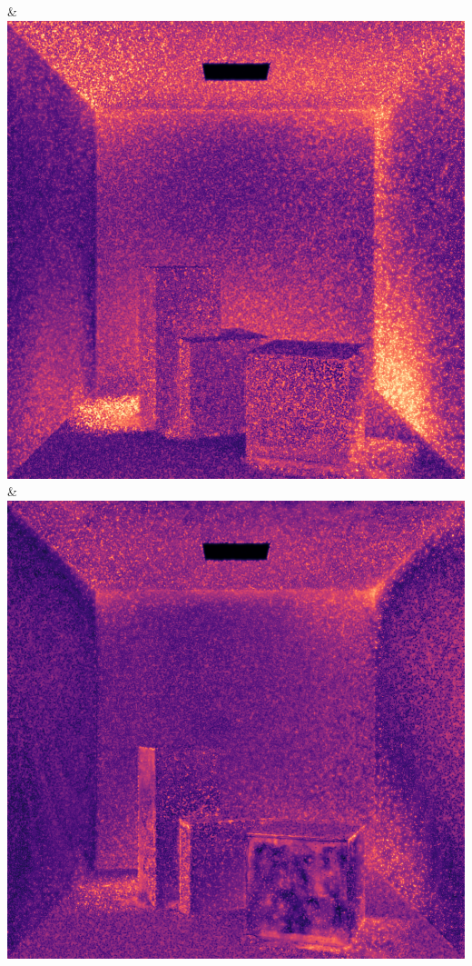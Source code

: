 & \includegraphics[width=\linewidth]{figures/py/tests/path_termination/sah_1spp_flip.png}
& \includegraphics[width=\linewidth]{figures/py/tests/path_termination/bth_1spp_flip.png}
